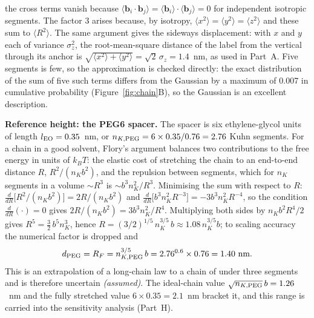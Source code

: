 \documentclass[10pt,a4paper]{article}
\numberwithin{equation}{section}
\newcommand{\FLAG}{\textit{(assumed)}}
\newcommand{\figref}[1]{Figure~\ref{#1}}
\newcommand{\dPEG}{1.40}
\newcommand{\ksGauss}{0.007}
\newcommand{\lateralRms}{1.4}
\begin{document}
the cross terms vanish because $\langle\mathbf b_i\cdot\mathbf b_j\rangle=\langle\mathbf b_i\rangle\cdot\langle\mathbf b_j\rangle=0$ for independent isotropic segments. The factor 3
arises because, by isotropy, $\langle x^2\rangle=\langle y^2\rangle=\langle z^2\rangle$ and these sum to
$\langle R^2\rangle$. The same argument gives the sideways displacement: with $x$ and $y$ each of variance $\sigma_z^2$, the
root-mean-square distance of the label from the vertical through its anchor is
$\sqrt{\langle x^2\rangle+\langle y^2\rangle}=\sqrt2\,\sigma_z=\lateralRms$~nm, as used in Part~A. Five segments is few, so the
approximation is checked directly: the exact distribution of the sum of five such terms
differs from the Gaussian by a maximum of \ksGauss{} in cumulative probability
(\figref{fig:chain}B), so the Gaussian is an excellent description.

\textbf{Reference height: the PEG6 spacer.} The spacer is six ethylene-glycol units of
length $l_{\rm EO}=0.35$~nm, or $n_{K,{\rm PEG}}=6\times0.35/0.76=2.76$ Kuhn segments. For a
chain in a good solvent, Flory's argument balances two contributions to the free energy in units of $k_BT$: the
elastic cost of stretching the chain to an end-to-end distance $R$, $R^2/(n_Kb^2)$, and the repulsion between segments,
which for $n_K$ segments in a volume $\sim R^3$ is $\sim b^3n_K^2/R^3$. Minimising the sum with respect to $R$: $\frac{d}{dR}\bigl[R^2/(n_Kb^2)\bigr]=2R/(n_Kb^2)$ and
$\frac{d}{dR}\bigl[b^3n_K^2R^{-3}\bigr]=-3b^3n_K^2R^{-4}$, so the condition $\frac{d}{dR}(\cdot)=0$ gives
$2R/(n_Kb^2)=3b^3n_K^2/R^4$. Multiplying both sides by $n_Kb^2R^4/2$ gives $R^5=\tfrac32\,b^5n_K^3$, hence
$R=(3/2)^{1/5}\,n_K^{3/5}\,b\approx1.08\,n_K^{3/5}b$; to scaling accuracy the numerical factor is dropped and
\begin{equation}
  d_{\rm PEG}=R_F=n_{K,{\rm PEG}}^{3/5}\,b=2.76^{0.6}\times0.76=\dPEG~\text{nm}.
  \label{eq:flory}
\end{equation}
This is an extrapolation of a long-chain law to a chain of under three segments and is
therefore uncertain \FLAG. The ideal-chain value $\sqrt{n_{K,{\rm PEG}}}\,b=1.26$~nm and the
fully stretched value $6\times0.35=2.1$~nm bracket it, and this range is carried into the
sensitivity analysis (Part~H).
\end{document}
